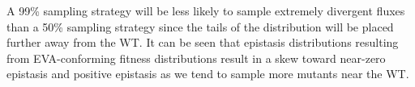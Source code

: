 A 99\% sampling strategy will be less likely to sample extremely
divergent fluxes than a 50\% sampling strategy since the tails of the
distribution will be placed further away from the WT. It can be seen
that epistasis distributions resulting from EVA-conforming fitness
distributions result in a skew toward near-zero epistasis and positive
epistasis as we tend to sample more mutants near the WT.










